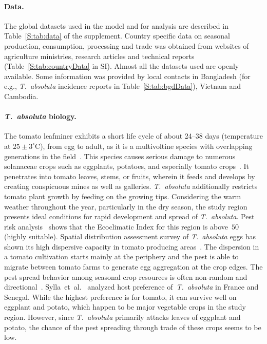 \documentclass[11pt]{article}
\newcommand{\tuta}{\emph{T.~absoluta}}
\theoremstyle{definition}
\begin{document}
\paragraph{Data.} The global datasets used in the model and for analysis are
described in Table~\ref{S:tab:data} of the supplement. Country specific data on
seasonal production, consumption, processing and trade was
obtained from websites of agriculture ministries, research articles and technical
reports (Table~\ref{S:tab:countryData} in SI). Almost
all the datasets used are openly available. Some information was
provided by local contacts in Bangladesh (for e.g., \tuta{} incidence
reports in Table~\ref{S:tab:bgdData}), Vietnam and Cambodia.
\paragraph{\tuta{} biology.}
The tomato leafminer exhibits a short life cycle of about 24--38 days
(temperature at $25\pm3^\circ$C), from egg to adult, as it is a
multivoltine species with overlapping generations in the
field~\cite{guedes2012tomato}. This species causes serious damage to
numerous solanaceae crops such as eggplants, potatoes, and especially
tomato crops~\cite{sylla2018}. It penetrates into tomato leaves, stems, or
fruits, wherein it feeds and develops by creating conspicuous mines as well
as galleries. \tuta{} additionally restricts tomato plant growth by feeding
on the growing tips. Considering the warm weather throughout the year,
particularly in the dry season, the study region presents ideal conditions
for rapid development and spread of \tuta{}. Pest risk
analysis~\cite{tonnang2015identification} shows that the Ecoclimatic Index
for this region is above~$50$ (highly suitable). Spatial distribution
assessment survey of \tuta{} eggs has shown its high dispersive capacity in
tomato producing areas~\cite{martins2018assessing}. The dispersion in a
tomato cultivation starts mainly at the periphery and
the pest is able to migrate between tomato farms to generate egg aggregation at the
crop edges. The pest spread behavior among seasonal crop resources
is often non-random and directional~\cite{martins2018assessing}.
Sylla~et~al.~\cite{sylla2018} analyzed host preference of~\tuta{} in France
and Senegal. While the highest preference is for tomato, it can survive
well on eggplant and potato, which happen to be major vegetable crops in
the study region. However, since \tuta{} primarily attacks leaves of
eggplant and potato, the chance of the pest spreading through trade of
these crops seems to be low.
\end{document}
